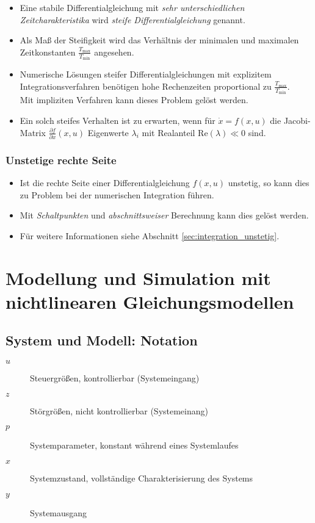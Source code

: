 \documentclass[a4paper, 11pt, accentcolor = tud3b]{tudreport}
\renewcommand{\Re}{\text{Re}}
\begin{document}
	            \begin{itemize}
	            	\item Eine stabile Differentialgleichung mit \textit{sehr unterschiedlichen Zeitcharakteristika} wird \textit{steife Differentialgleichung} genannt.
	            	\item Als Maß der Steifigkeit wird das Verhältnis der minimalen und maximalen Zeitkonstanten \( \frac{T_\text{max}}{T_\text{min}} \) angesehen.
	            	\item Numerische Lösungen steifer Differentialgleichungen mit explizitem Integrationsverfahren benötigen hohe Rechenzeiten proportional zu \( \frac{T_\text{max}}{T_\text{min}} \). \\ Mit impliziten Verfahren kann dieses Problem gelöst werden.
	            	\item Ein solch steifes Verhalten ist zu erwarten, wenn für \( \dot{x} = f(x, u) \) die Jacobi-Matrix \( \frac{\partial f}{\partial x}(x, u) \) Eigenwerte \( \lambda _ i \) mit Realanteil \( \Re(\lambda) \ll 0 \) sind.
	            \end{itemize}

            \subsection{Unstetige rechte Seite} %
                \begin{itemize}
                	\item Ist die rechte Seite einer Differentialgleichung \( f(x, u) \) unstetig, so kann dies zu Problem bei der numerischen Integration führen.
                	\item Mit \textit{Schaltpunkten} und \textit{abschnittsweiser} Berechnung kann dies gelöst werden.
                	\item Für weitere Informationen siehe Abschnitt \ref{sec:integration_unstetig}.
                \end{itemize}

    \chapter{Modellung und Simulation mit nichtlinearen Gleichungsmodellen} %
        \section{System und Modell: Notation} %
	        \begin{description}
	        	\item[\(u\)] Steuergrößen, kontrollierbar (Systemeingang)
	        	\item[\(z\)] Störgrößen, nicht kontrollierbar (Systemeinang)
	        	\item[\(p\)] Systemparameter, konstant während eines Systemlaufes
	        	\item[\(x\)] Systemzustand, vollständige Charakterisierung des Systems
	        	\item[\(y\)] Systemausgang
	        \end{description}
	        
\end{document}
